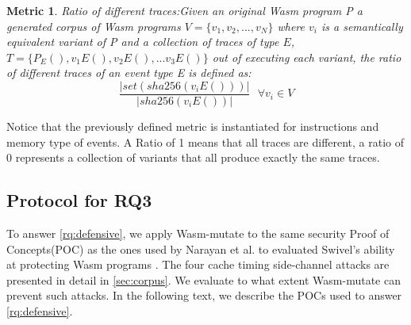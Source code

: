 \documentclass[sigplan,screen]{acmart}
\newcommand*\badge[1]{ \colorbox{red}{\color{white}#1}}
\newcommand{\tool}{Wasm-mutate\xspace}
\newcommand{\wasm}{Wasm\xspace}
\newtheorem{metric}{Metric}
\newcommand{\todo}[1]{%
\refstepcounter{todo}
\noindent\textbf{\badge{TODO}} {\color{red}#1}
\addcontentsline{td}{todo}
{\color{red}\thesection.\thetodo\xspace #1}}
\begin{document}


\begin{metric}{Ratio of different traces:}\label{metric:mem:sha}
Given an original \wasm program P a generated corpus of \wasm programs $V=\{v_1, v_2, ..., v_N\}$ where $v_i$ is a semantically equivalent variant of P and a collection of traces of type $E$, $T=\{P_E(), v_1E(), v_2E(), ...v_3E()\}$ out of executing each variant, the ratio of different traces of an event type E is defined as:
$$
    \frac{| set(sha256(v_iE()))|}{| sha256(v_iE())|}\text{ } \forall v_i \in V 
$$

\end{metric}

Notice that the previously defined metric is instantiated for instructions and memory type of events.
A Ratio of 1 means that all traces are different, a ratio of 0 represents a collection of variants that all produce exactly the same traces.




\subsection{Protocol for RQ3}
\label{protocol:rq3}

\newcommand{\poct}{\emph{Cache timing POC}\xspace}
\newcommand{\pocd}{\emph{Differential computing POC}\xspace}
\newcommand{\pocp}{\emph{Port contention POC}\xspace}

To answer \ref{rq:defensive}, we apply \tool to the same security Proof of Concepts(POC) 
as the ones used by Narayan et al. to evaluated Swivel's ability at protecting \wasm programs \cite{Swivel}. 
The four cache timing side-channel attacks are presented in detail in \autoref{sec:corpus}. 
We evaluate to what extent \tool can prevent such attacks.
In the following text, we describe the POCs used to answer \ref{rq:defensive}.

\end{document}
